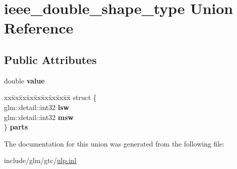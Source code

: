 \hypertarget{unionieee__double__shape__type}{}\section{ieee\+\_\+double\+\_\+shape\+\_\+type Union Reference}
\label{unionieee__double__shape__type}
\subsection*{Public Attributes}
\begin{DoxyCompactItemize}
\item 
\mbox{\label{unionieee__double__shape__type_a2d9c4cab9e3fa74e4be6d72f798a145b}} 
double {\bfseries value}
\item 
\mbox{\label{unionieee__double__shape__type_aac525c7c74b266e1e6e4afd83536665d}} 
\begin{tabbing}
xx\=xx\=xx\=xx\=xx\=xx\=xx\=xx\=xx\=\kill
struct \{\\
\>glm::detail::int32 {\bfseries lsw}\\
\>glm::detail::int32 {\bfseries msw}\\
\} {\bfseries parts}\\

\end{tabbing}\end{DoxyCompactItemize}


The documentation for this union was generated from the following file\+:\begin{DoxyCompactItemize}
\item 
include/glm/gtc/\hyperlink{ulp_8inl}{ulp.\+inl}\end{DoxyCompactItemize}
